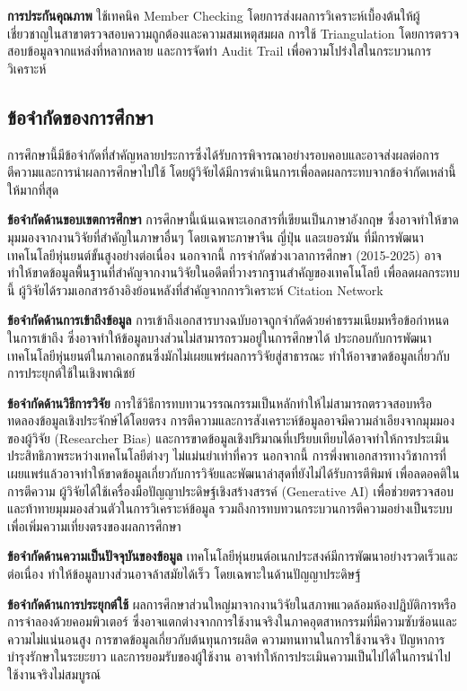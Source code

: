 \documentclass[a4paper]{article}
\begin{document}
\textbf{การประกันคุณภาพ} ใช้เทคนิค Member Checking โดยการส่งผลการวิเคราะห์เบื้องต้นให้ผู้เชี่ยวชาญในสาขาตรวจสอบความถูกต้องและความสมเหตุสมผล การใช้ Triangulation โดยการตรวจสอบข้อมูลจากแหล่งที่หลากหลาย และการจัดทำ Audit Trail เพื่อความโปร่งใสในกระบวนการวิเคราะห์

\subsection{ข้อจำกัดของการศึกษา}

การศึกษานี้มีข้อจำกัดที่สำคัญหลายประการซึ่งได้รับการพิจารณาอย่างรอบคอบและอาจส่งผลต่อการตีความและการนำผลการศึกษาไปใช้ โดยผู้วิจัยได้มีการดำเนินการเพื่อลดผลกระทบจากข้อจำกัดเหล่านี้ให้มากที่สุด

\textbf{ข้อจำกัดด้านขอบเขตการศึกษา} การศึกษานี้เน้นเฉพาะเอกสารที่เขียนเป็นภาษาอังกฤษ ซึ่งอาจทำให้ขาดมุมมองจากงานวิจัยที่สำคัญในภาษาอื่นๆ โดยเฉพาะภาษาจีน ญี่ปุ่น และเยอรมัน ที่มีการพัฒนาเทคโนโลยีหุ่นยนต์ขั้นสูงอย่างต่อเนื่อง นอกจากนี้ การจำกัดช่วงเวลาการศึกษา (2015-2025) อาจทำให้ขาดข้อมูลพื้นฐานที่สำคัญจากงานวิจัยในอดีตที่วางรากฐานสำคัญของเทคโนโลยี เพื่อลดผลกระทบนี้ ผู้วิจัยได้รวมเอกสารอ้างอิงย้อนหลังที่สำคัญจากการวิเคราะห์ Citation Network

\textbf{ข้อจำกัดด้านการเข้าถึงข้อมูล} การเข้าถึงเอกสารบางฉบับอาจถูกจำกัดด้วยค่าธรรมเนียมหรือข้อกำหนดในการเข้าถึง ซึ่งอาจทำให้ข้อมูลบางส่วนไม่สามารถรวมอยู่ในการศึกษาได้ ประกอบกับการพัฒนาเทคโนโลยีหุ่นยนต์ในภาคเอกชนซึ่งมักไม่เผยแพร่ผลการวิจัยสู่สาธารณะ ทำให้อาจขาดข้อมูลเกี่ยวกับการประยุกต์ใช้ในเชิงพาณิชย์

\textbf{ข้อจำกัดด้านวิธีการวิจัย} การใช้วิธีการทบทวนวรรณกรรมเป็นหลักทำให้ไม่สามารถตรวจสอบหรือทดลองข้อมูลเชิงประจักษ์ได้โดยตรง การตีความและการสังเคราะห์ข้อมูลอาจมีความลำเอียงจากมุมมองของผู้วิจัย (Researcher Bias) และการขาดข้อมูลเชิงปริมาณที่เปรียบเทียบได้อาจทำให้การประเมินประสิทธิภาพระหว่างเทคโนโลยีต่างๆ ไม่แม่นยำเท่าที่ควร นอกจากนี้ การพึ่งพาเอกสารทางวิชาการที่เผยแพร่แล้วอาจทำให้ขาดข้อมูลเกี่ยวกับการวิจัยและพัฒนาล่าสุดที่ยังไม่ได้รับการตีพิมพ์ เพื่อลดอคติในการตีความ ผู้วิจัยได้ใช้เครื่องมือปัญญาประดิษฐ์เชิงสร้างสรรค์ (Generative AI) เพื่อช่วยตรวจสอบและท้าทายมุมมองส่วนตัวในการวิเคราะห์ข้อมูล รวมถึงการทบทวนกระบวนการตีความอย่างเป็นระบบเพื่อเพิ่มความเที่ยงตรงของผลการศึกษา

\textbf{ข้อจำกัดด้านความเป็นปัจจุบันของข้อมูล} เทคโนโลยีหุ่นยนต์อเนกประสงค์มีการพัฒนาอย่างรวดเร็วและต่อเนื่อง ทำให้ข้อมูลบางส่วนอาจล้าสมัยได้เร็ว โดยเฉพาะในด้านปัญญาประดิษฐ์

\textbf{ข้อจำกัดด้านการประยุกต์ใช้} ผลการศึกษาส่วนใหญ่มาจากงานวิจัยในสภาพแวดล้อมห้องปฏิบัติการหรือการจำลองด้วยคอมพิวเตอร์ ซึ่งอาจแตกต่างจากการใช้งานจริงในภาคอุตสาหกรรมที่มีความซับซ้อนและความไม่แน่นอนสูง การขาดข้อมูลเกี่ยวกับต้นทุนการผลิต ความทนทานในการใช้งานจริง ปัญหาการบำรุงรักษาในระยะยาว และการยอมรับของผู้ใช้งาน อาจทำให้การประเมินความเป็นไปได้ในการนำไปใช้งานจริงไม่สมบูรณ์
\end{document}
